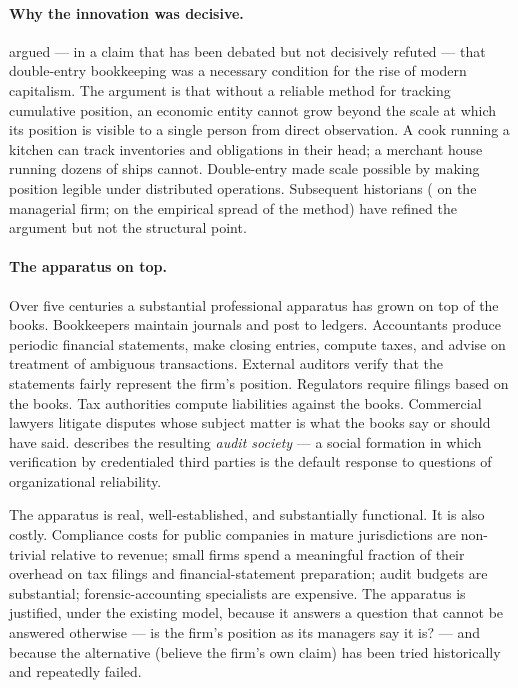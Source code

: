 \documentclass[11pt,a4paper]{article}
\theoremstyle{definition}
\theoremstyle{remark}
\begin{document}
\paragraph{Why the innovation was decisive.}
\citet{sombart1916moderne} argued --- in a claim that has been
debated but not decisively refuted --- that double-entry
bookkeeping was a necessary condition for the rise of modern
capitalism. The argument is that without a reliable method for
tracking cumulative position, an economic entity cannot grow
beyond the scale at which its position is visible to a single
person from direct observation. A cook running a kitchen can
track inventories and obligations in their head; a merchant
house running dozens of ships cannot. Double-entry made scale
possible by making position legible under distributed
operations. Subsequent historians
(\citealt{chandler1977visible} on the managerial firm;
\citealt{yamey2005pacioli} on the empirical spread of the
method) have refined the argument but not the structural point.

\paragraph{The apparatus on top.}
Over five centuries a substantial professional apparatus has
grown on top of the books. Bookkeepers maintain journals and
post to ledgers. Accountants produce periodic financial
statements, make closing entries, compute taxes, and advise on
treatment of ambiguous transactions. External auditors verify
that the statements fairly represent the firm's position.
Regulators require filings based on the books. Tax authorities
compute liabilities against the books. Commercial lawyers
litigate disputes whose subject matter is what the books say
or should have said. \citet{power1997audit} describes the
resulting \emph{audit society} --- a social formation in which
verification by credentialed third parties is the default
response to questions of organizational reliability.

The apparatus is real, well-established, and substantially
functional. It is also costly. Compliance costs for public
companies in mature jurisdictions are non-trivial relative
to revenue; small firms spend a meaningful fraction of
their overhead on tax filings and financial-statement
preparation; audit budgets are substantial;
forensic-accounting specialists are expensive.
The apparatus is justified, under the existing model, because
it answers a question that cannot be answered otherwise ---
is the firm's position as its managers say it is? --- and
because the alternative (believe the firm's own claim) has
been tried historically and repeatedly failed.
\end{document}
